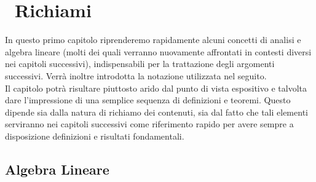 \documentclass[a4paper,12pt]{report}
\begin{document}
\clearpage
\vspace*{-2cm}
\tableofcontents
{}
\newpage
\thispagestyle{empty}
\newpage

\fancyhead[RO]{\nouppercase{\leftmark\ -- \rightmark}}
\chapter{\ Richiami}

In questo primo capitolo riprenderemo rapidamente alcuni concetti di analisi e algebra lineare (molti dei quali verranno nuovamente affrontati in contesti diversi nei capitoli successivi), indispensabili per la trattazione degli argomenti successivi. Verrà inoltre introdotta la notazione utilizzata nel seguito.
\\Il capitolo potrà risultare piuttosto arido dal punto di vista espositivo e talvolta dare l’impressione di una semplice sequenza di definizioni e teoremi. Questo dipende sia dalla natura di richiamo dei contenuti, sia dal fatto che tali elementi serviranno nei capitoli successivi come riferimento rapido per avere sempre a disposizione definizioni e risultati fondamentali.

\section{Algebra Lineare}\label{sec: 1.1}
\end{document}
